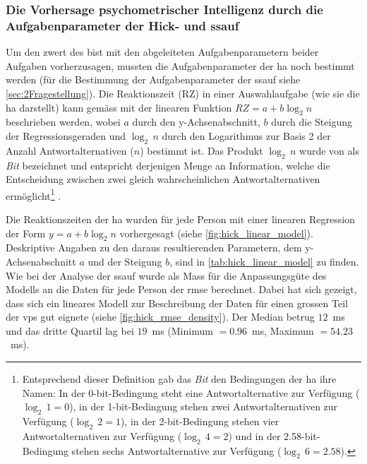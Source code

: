 \documentclass[11pt, twoside, a4paper]{book}		%
\begin{document}









\subsubsection*{Die Vorhersage psychometrischer Intelligenz durch die Aufgabenparameter der Hick- und \gls{ssauf}}

Um den \gls{zwert} des \gls{bist} mit den abgeleiteten Aufgabenparametern beider Aufgaben vorherzusagen, mussten die Aufgabenparameter der \gls{ha} noch bestimmt werden (für die Bestimmung der Aufgabenparameter der \gls{ssauf} siehe \autoref{sec:2Fragestellung}). 
Die Reaktionszeit (RZ) in einer Auswahlaufgabe (wie sie die \gls{ha} darstellt) kann gemäss \citet[S. 105]{Jensen1987a} mit der linearen Funktion $RZ=a+b\log_{2}n$ beschrieben werden, wobei $a$ durch den y-Achsenabschnitt, $b$ durch die Steigung der Regressionsgeraden und $\log_{2}\,n$ durch den Logarithmus zur Basis 2 der Anzahl Antwortalternativen ($n$) bestimmt ist.
Das Produkt $\log_{2}\,n$ wurde von \citet{Hick1952} als \textit{Bit} bezeichnet und entspricht derjenigen Menge an Information, welche die Entscheidung zwischen zwei gleich wahrscheinlichen Antwortalternativen ermöglicht\footnote{Entsprechend dieser Definition gab das \textit{Bit} den Bedingungen der \gls{ha} ihre Namen: In der 0-bit-Bedingung steht eine Antwortalternative zur Verfügung ($\log_{2}\,1=0$), in der 1-bit-Bedingung stehen zwei Antwortalternativen zur Verfügung ($\log_{2}\,2=1$), in der 2-bit-Bedingung stehen vier Antwortalternativen zur Verfügung ($\log_{2}\,4=2$) und in der 2.58-bit-Bedingung stehen sechs Antwortalternative zur Verfügung ($\log_{2}\,6=2.58$).} \citep[siehe auch][S. 27]{Jensen2006}.

Die Reaktionszeiten der \gls{ha} wurden für jede Person mit einer linearen Regression der Form $y=a+b\log_{2}n$  vorhergesagt (siehe \autoref{fig:hick_linear_model}). Deskriptive Angaben zu den daraus resultierenden Parametern, dem y-Achsenabschnitt $a$ und der Steigung $b$, sind in \autoref{tab:hick_linear_model} zu finden. Wie bei der Analyse der \gls{ssauf} wurde als Mass für die Anpassungsgüte des Modells an die Daten für jede Person der \gls{rmse} berechnet. Dabei hat sich gezeigt, dass sich ein lineares Modell zur Beschreibung der Daten für einen grossen Teil der \glspl{vp} gut eignete (siehe \autoref{fig:hick_rmse_density}). Der Median betrug $12$~ms und das dritte Quartil lag bei $19$~ms (Minimum $=0.96$~ms, Maximum $=54.23$~ms).
\end{document}
